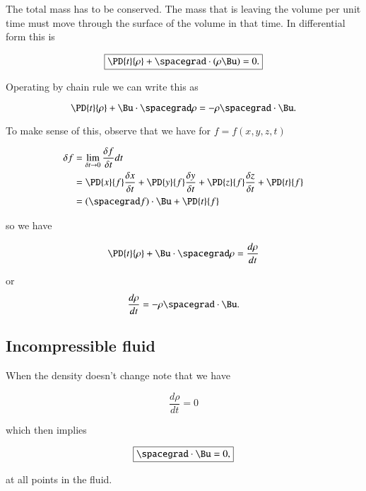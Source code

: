 The total mass has to be conserved.  The mass that is leaving the volume per unit time must move through the surface of the volume in that time.  In differential form this is

\begin{equation}\label{eqn:continuumL9:470}
\boxed{
\PD{t}{\rho} + \spacegrad \cdot (\rho \Bu) = 0.
}
\end{equation}

Operating by chain rule we can write this as

\begin{equation}\label{eqn:continuumL9:490}
\PD{t}{\rho} + \Bu \cdot \spacegrad \rho = - \rho \spacegrad \cdot \Bu.
\end{equation}

To make sense of this, observe that we have for $f = f(x, y, z, t)$

\begin{align*}
\delta f 
&= \lim_{\delta t \rightarrow 0} \frac{\delta f}{\delta t} dt \\
&=
\PD{x}{f} \frac{\delta x}{\delta t}
+\PD{y}{f} \frac{\delta y}{\delta t}
+\PD{z}{f} \frac{\delta z}{\delta t}
+ \PD{t}{f} \\
&=
(\spacegrad f) \cdot \Bu + \PD{t}{f}
\end{align*}

so we have

\begin{equation}\label{eqn:continuumL9:510}
\PD{t}{\rho} + \Bu \cdot \spacegrad \rho = \frac{d\rho}{dt}
\end{equation}

or
\begin{equation}\label{eqn:continuumL9:530}
\frac{d\rho}{dt} = - \rho \spacegrad \cdot \Bu.
\end{equation}

\subsection{Incompressible fluid}

When the density doesn't change note that we have

\begin{equation}\label{eqn:continuumL9:550}
\frac{d\rho}{dt} = 0
\end{equation}

which then implies

\begin{equation}\label{eqn:continuumL9:570}
\boxed{
\spacegrad \cdot \Bu = 0,
}
\end{equation}

at all points in the fluid.

\EndArticle
